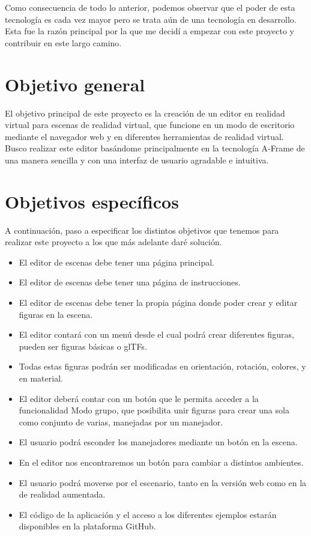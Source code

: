\documentclass[a4paper, 12pt]{book}
\begin{document}
Como consecuencia de todo lo anterior, podemos observar que el poder de esta tecnología es cada vez mayor pero se trata aún de una tecnología en desarrollo. Esta fue la razón principal por la que me decidí a empezar con este proyecto y contribuir en este largo camino.

\section{Objetivo general}
\label{sec:objetivo general}

El objetivo principal de este proyecto es la creación de un editor en realidad virtual para escenas de realidad virtual, que funcione en un modo de escritorio mediante el navegador web y en diferentes herramientas de realidad virtual. Busco realizar este editor basándome principalmente en la tecnología A-Frame de una manera sencilla y con una interfaz de usuario agradable e intuitiva.

\section{Objetivos específicos}
\label{sec:Objetivos específicos}

A continuación, paso a especificar los distintos objetivos que tenemos para realizar este proyecto a los que más adelante daré solución. 

\begin{itemize}
  \item El editor de escenas debe tener una página principal.
  \item El editor de escenas debe tener una página de instrucciones.
  \item El editor de escenas debe tener la propia página donde poder crear y editar figuras en la escena.
  \item El editor contará con un menú desde el cual podrá crear diferentes figuras, pueden ser figuras básicas o glTFs.
  \item Todas estas figuras podrán ser modificadas en orientación, rotación, colores, y en material.
  \item El editor deberá contar con un botón que le permita acceder a la funcionalidad Modo grupo, que posibilita unir figuras para crear una sola como conjunto de varias, manejadas por un manejador.
  \item El usuario podrá esconder los manejadores mediante un botón en la escena.  
  \item En el editor nos encontraremos un botón para cambiar a distintos ambientes.
  \item El usuario podrá moverse por el escenario, tanto en la versión web como en la de realidad aumentada.
  \item El código de la aplicación y el acceso a los diferentes ejemplos estarán disponibles en la plataforma GitHub.
\end{itemize}
\end{document}
